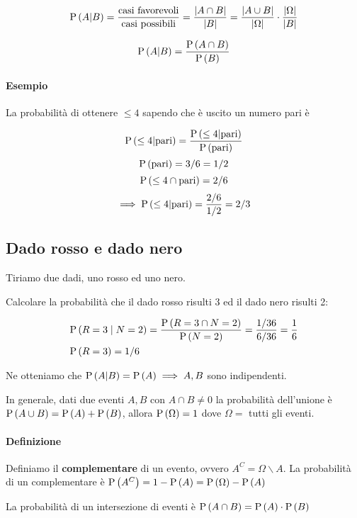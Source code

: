 \[ \text{P}\left(A|B\right) = \dfrac{\text{casi favorevoli}}{\text{casi possibili}} = \dfrac{\lvert A \cap B\rvert}{\lvert B\rvert} = \dfrac{\lvert A \cup B\rvert}{\lvert\Omega\rvert} \cdot \dfrac{\lvert\Omega\rvert}{\lvert B\rvert}\]

\[ \text{P}\left(A|B\right) = \dfrac{\text{P}\left(A \cap B\right)}{\text{P}\left(B\right)} \]

\paragraph{Esempio}
La probabilità di ottenere $ \leq 4 $ sapendo che è uscito un numero pari è

\[ \text{P}\left(\leq 4|\text{pari}\right) = \dfrac{\text{P}\left(\leq 4 | \text{pari}\right)}{\text{P}\left(\text{pari}\right)} \]
\[ \text{P}\left(\text{pari}\right) = 3/6 = 1/2 \]
\[ \text{P}\left(\leq 4 \cap \text{pari}\right) = 2/6 \]
\[ \implies \text{P}\left(\leq 4|\text{pari}\right) = \dfrac{2/6}{1/2} = 2/3 \]  
\subsection{Dado rosso e dado nero}

Tiriamo due dadi, uno rosso ed uno nero.

Calcolare la probabilità che il dado rosso risulti 3 ed il dado nero risulti 2:

\begin{align*}
	& \text{P}\left(R=3 \mid N=2\right) = \dfrac{\text{P}\left(R=3 \cap N=2\right)}{\text{P}\left(N=2\right)} = \dfrac{1/36}{6/36} = \dfrac{1}{6} \\
	& \text{P}\left(R=3\right) = 1/6
\end{align*}

Ne otteniamo che $ \text{P}\left(A|B\right) = \text{P}\left(A\right) \implies A, B $ sono indipendenti.

In generale, dati due eventi $ A, B $ con $ A \cap B \neq 0 $ la probabilità dell'unione è $ \text{P}\left(A \cup B\right) = \text{P}\left(A\right) + \text{P}\left(B\right) $, allora $ \text{P}\left(\Omega\right) = 1 $ dove $ \Omega = $ tutti gli eventi.

\paragraph{Definizione} Definiamo il \textbf{complementare} di un evento, ovvero $ A^C=\Omega \backslash A $. La probabilità di un complementare è $ \text{P}\left(A^C\right) = 1 - \text{P}\left(A\right) = \text{P}\left(\Omega\right) - \text{P}\left(A\right) $

La probabilità di un intersezione di eventi è $ \text{P}\left(A \cap B\right) = \text{P}\left(A\right) \cdot \text{P}\left(B\right) $

\clearpage
